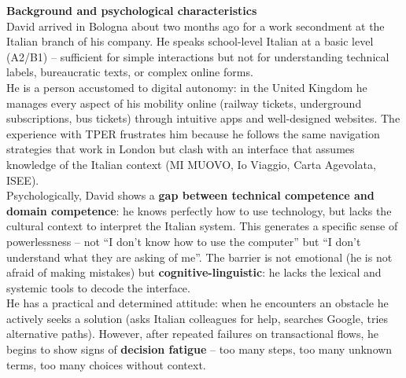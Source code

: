 ﻿\documentclass[11pt,a4paper]{article}
\begin{document}
\begin{tcolorbox}[base]
    \textbf{Background and psychological characteristics} \\[4pt]
    {\small
    David arrived in Bologna about two months ago for a work secondment at the Italian branch of his company. He speaks school-level Italian at a basic level (A2/B1) -- sufficient for simple interactions but not for understanding technical labels, bureaucratic texts, or complex online forms. \\[4pt]

    He is a person accustomed to digital autonomy: in the United Kingdom he manages every aspect of his mobility online (railway tickets, underground subscriptions, bus tickets) through intuitive apps and well-designed websites. The experience with TPER frustrates him because he follows the same navigation strategies that work in London but clash with an interface that assumes knowledge of the Italian context (MI MUOVO, Io Viaggio, Carta Agevolata, ISEE). \\[4pt]

    Psychologically, David shows a \textbf{gap between technical competence and domain competence}: he knows perfectly how to use technology, but lacks the cultural context to interpret the Italian system. This generates a specific sense of powerlessness -- not ``I don't know how to use the computer'' but ``I don't understand what they are asking of me''. The barrier is not emotional (he is not afraid of making mistakes) but \textbf{cognitive-linguistic}: he lacks the lexical and systemic tools to decode the interface. \\[4pt]

    He has a practical and determined attitude: when he encounters an obstacle he actively seeks a solution (asks Italian colleagues for help, searches Google, tries alternative paths). However, after repeated failures on transactional flows, he begins to show signs of \textbf{decision fatigue} -- too many steps, too many unknown terms, too many choices without context.
    }
\end{tcolorbox}

\vspace{0.3cm}

\end{document}
